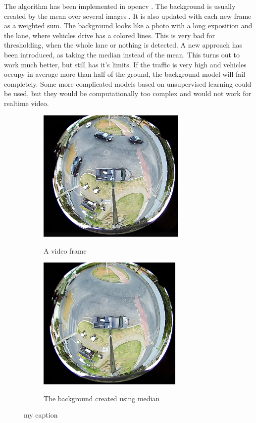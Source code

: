 \documentclass[a4paper,12pt,titlepage, twoside]{article}
\numberwithin{figure}{section}
\begin{document}
The algorithm has been implemented in opencv \cite{opencv}. The background is usually created by the mean over several images \cite{bs1, bs2}. It is also updated with each new frame as a weighted sum. The background looks like a photo with a long exposition and the lane, where vehicles drive has a colored lines. This is very bad for thresholding, when the whole lane or nothing is detected. A new approach has been introduced, as taking the median instead of the mean. This turns out to work much better, but still has it's limits. If the traffic is very high and vehicles occupy in average more than half of the ground, the background model will fail completely. Some more complicated models based on unsupervised learning could be used, but they would be computationally too complex and would not work for realtime video.



\begin{figure}
    \begin{subfigure}[Sample1]{0.5\linewidth}
        \includegraphics[height=65mm]{fig/frame.png}
        \label{fig:a}
        \caption{A video frame}
    \end{subfigure}
    \qquad
    \begin{subfigure}[Sample1]{0.5\linewidth}    
        \includegraphics[height=65mm]{fig/background.png}
        \label{fig:b}    
        \caption{The background created using median}
    \end{subfigure} 
    \caption{my caption}
\end{figure}
\end{document}

